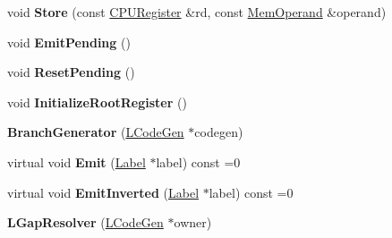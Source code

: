 \begin{DoxyCompactItemize}
\item 
void {\bfseries Store} (const \hyperlink{structv8_1_1internal_1_1_c_p_u_register}{C\+P\+U\+Register} \&rd, const \hyperlink{classv8_1_1internal_1_1_mem_operand}{Mem\+Operand} \&operand)\hypertarget{classv8_1_1internal_1_1_b_a_s_e___e_m_b_e_d_d_e_d_a0b0f7f083df2331504b581fb7f219d3a}{}\label{classv8_1_1internal_1_1_b_a_s_e___e_m_b_e_d_d_e_d_a0b0f7f083df2331504b581fb7f219d3a}

\item 
void {\bfseries Emit\+Pending} ()\hypertarget{classv8_1_1internal_1_1_b_a_s_e___e_m_b_e_d_d_e_d_afb2fc6018a30b04829d6b146474a8488}{}\label{classv8_1_1internal_1_1_b_a_s_e___e_m_b_e_d_d_e_d_afb2fc6018a30b04829d6b146474a8488}

\item 
void {\bfseries Reset\+Pending} ()\hypertarget{classv8_1_1internal_1_1_b_a_s_e___e_m_b_e_d_d_e_d_a18041a9f1065c5c6b6c2266725560795}{}\label{classv8_1_1internal_1_1_b_a_s_e___e_m_b_e_d_d_e_d_a18041a9f1065c5c6b6c2266725560795}

\item 
void {\bfseries Initialize\+Root\+Register} ()\hypertarget{classv8_1_1internal_1_1_b_a_s_e___e_m_b_e_d_d_e_d_ae00f89468d8795d9276d0b729401ae48}{}\label{classv8_1_1internal_1_1_b_a_s_e___e_m_b_e_d_d_e_d_ae00f89468d8795d9276d0b729401ae48}

\item 
{\bfseries Branch\+Generator} (\hyperlink{classv8_1_1internal_1_1_l_code_gen}{L\+Code\+Gen} $\ast$codegen)\hypertarget{classv8_1_1internal_1_1_b_a_s_e___e_m_b_e_d_d_e_d_a25fead8fe9db15ff105d293f75e15068}{}\label{classv8_1_1internal_1_1_b_a_s_e___e_m_b_e_d_d_e_d_a25fead8fe9db15ff105d293f75e15068}

\item 
virtual void {\bfseries Emit} (\hyperlink{classv8_1_1internal_1_1_label}{Label} $\ast$label) const  =0\hypertarget{classv8_1_1internal_1_1_b_a_s_e___e_m_b_e_d_d_e_d_ae7ae3abc4d1d5bf092053644fe5b44dc}{}\label{classv8_1_1internal_1_1_b_a_s_e___e_m_b_e_d_d_e_d_ae7ae3abc4d1d5bf092053644fe5b44dc}

\item 
virtual void {\bfseries Emit\+Inverted} (\hyperlink{classv8_1_1internal_1_1_label}{Label} $\ast$label) const  =0\hypertarget{classv8_1_1internal_1_1_b_a_s_e___e_m_b_e_d_d_e_d_ae1b2481cb2f3ecc6606848f0bc1a87da}{}\label{classv8_1_1internal_1_1_b_a_s_e___e_m_b_e_d_d_e_d_ae1b2481cb2f3ecc6606848f0bc1a87da}

\item 
{\bfseries L\+Gap\+Resolver} (\hyperlink{classv8_1_1internal_1_1_l_code_gen}{L\+Code\+Gen} $\ast$owner)\hypertarget{classv8_1_1internal_1_1_b_a_s_e___e_m_b_e_d_d_e_d_a0b23d339700f93d3affcf5f4f550d22b}{}\label{classv8_1_1internal_1_1_b_a_s_e___e_m_b_e_d_d_e_d_a0b23d339700f93d3affcf5f4f550d22b}


\end{DoxyCompactItemize}
